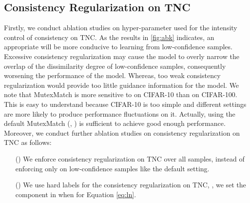 \documentclass[lettersize,journal]{IEEEtran}
\theoremstyle{plain}
\theoremstyle{definition}
\theoremstyle{remark}
\begin{document}
 
\subsection{Consistency Regularization on TNC}
\label{subsec:cr}
Firstly, we conduct ablation studies on hyper-parameter  used for the intensity control of consistency on TNC. As the results in \cref{fig:abk} indicates, an appropriate  will be more conducive to learning from low-confidence samples. Excessive consistency regularization may cause the model to overly narrow the overlap of the dissimilarity degree of low-confidence samples, consequently worsening the performance of the model. Whereas, too weak consistency regularization would provide too little guidance information for the model. We  note that MutexMatch is more sensitive to  on CIFAR-10 than on CIFAR-100. This is easy to understand because CIFAR-10 is too simple and different settings are more likely to produce performance fluctuations on it. Actually, using the default MutexMatch (\ie, ) is sufficient to achieve good enough performance. Moreover, we conduct further ablation studies on consistency regularization on TNC as follows:
\begin{enumerate}
  \item [(\romannumeral1)] 
  We enforce consistency regularization on TNC over all samples, instead of enforcing only on low-confidence samples like the default setting.     
  \item [(\romannumeral2)]
  We use hard labels for the consistency regularization on TNC, \ie, we set the component  in  when  for Equation \eqref{eq:ln}.
\end{enumerate}
\end{document}
